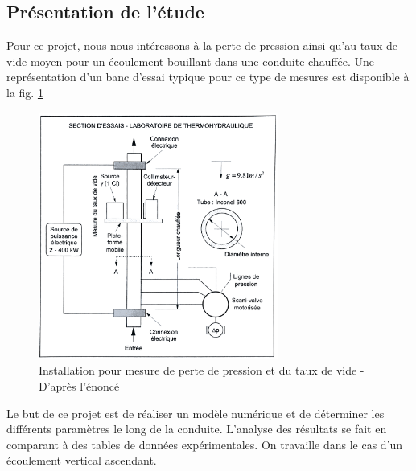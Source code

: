 



\subsection{Présentation de l'étude}

Pour ce projet, nous nous intéressons à la perte de pression ainsi qu'au taux de vide moyen pour un écoulement bouillant dans une conduite chauffée. Une représentation d'un banc d'essai typique pour ce type de mesures est disponible à la fig. \ref{fig:instal}

\begin{figure}[ht]%
    \centering
    \includegraphics[width=0.7\textwidth]{images/schema_instal.png}
    \caption{Installation pour mesure de perte de pression et du taux de vide - D'après l'énoncé}
    \label{fig:instal}
\end{figure}

Le but de ce projet est de réaliser un modèle numérique et de déterminer les différents paramètres le long de la conduite. L'analyse des résultats se fait en comparant à des tables de données expérimentales. On travaille dans le cas d'un écoulement vertical ascendant.\\ \par

